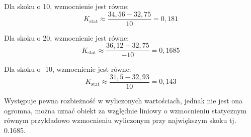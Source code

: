 Dla skoku o 10, wzmocnienie jest równe:
\begin{equation}
K_{\mathrm{stat}}\approx \frac{34,56-32,75}{10}=0,181
\label{zad2_wzm_statyczne_wzor1}
\end{equation}




Dla skoku o 20, wzmocnienie jest równe:
\begin{equation}
K_{\mathrm{stat}}\approx \frac{36,12-32,75}{-10}=0,1685
\label{zad2_wzm_statyczne_wzor2}
\end{equation}

Dla skoku o -10, wzmocnienie jest równe:
\begin{equation}
K_{\mathrm{stat}}\approx \frac{31,5-32,93}{10}=0,143
\label{zad2_wzm_statyczne_wzor3}
\end{equation}



Występuje pewna rozbieżność w wyliczonych wartościach, jednak nie jest ona ogromna, można uznać obiekt za względnie liniowy o wzmocnieniu statycznym równym przykładowo wzmocnieniu wyliczonym przy największym skoku tj. \num {0,1685}.



